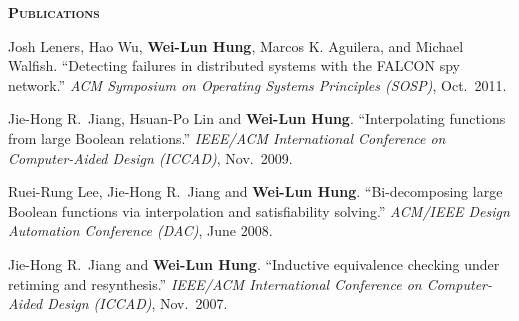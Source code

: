 \documentclass[11pt, letterpaper]{article}
\newcommand{\myscitem}[1]{\vspace{0.5\baselineskip} {\Large \textbf{\textsc{#1}} \reallynopagebreak}}
\newcommand{\mydate}[1]{{\small #1}}
\newcommand{\myname}[1]{{\bf #1}}
\newcommand{\myright}{\hspace*\fill}
\newcommand{\myrightdate}[1]{\myright \mydate{#1}}
\newenvironment{myexp}{
  \begin{list}{}{
      \setlength{\itemindent}{-0.15in}
      \setlength{\leftmargin}{0.3in}
      \addtolength{\topsep}{-0.1in}
    }
}{\end{list}}
\newenvironment{myenumerate}{
  \begin{list}{[\arabic{enumi}]}{
      \usecounter{enumi}
      \setlength{\itemindent}{0in}
      \setlength{\leftmargin}{0.3in}
      \addtolength{\topsep}{-0.1in}
    }
}{\end{list}}
\newenvironment{mybullet}{
  \begin{list}{\labelitemi}{
      \setlength{\itemindent}{0in}
      \setlength{\leftmargin}{0.15in}
      \setlength{\topsep}{0.02in}
      \setlength{\partopsep}{0pt}
    }
}{\end{list}}
\begin{document}
\begin{myexp}
\end{myexp}

\myscitem{Publications}

\begin{myenumerate}
\item Josh Leners, Hao Wu, \myname{Wei-Lun Hung}, Marcos K. Aguilera, and Michael Walfish.
``Detecting failures in distributed systems with the FALCON spy network.''
{\it ACM Symposium on Operating Systems Principles (SOSP)}, Oct.~2011.
\item Jie-Hong R.~Jiang, Hsuan-Po Lin and  \myname{Wei-Lun Hung}.
  ``Interpolating functions from large Boolean relations.''
  {\it  IEEE/ACM International Conference on Computer-Aided Design (ICCAD)},  Nov.~2009.
\item Ruei-Rung Lee, Jie-Hong R.~Jiang and \myname{Wei-Lun Hung}.
  ``Bi-decomposing large Boolean functions via interpolation and satisfiability solving.''
  {\it ACM/IEEE Design Automation Conference (DAC)}, June 2008. %
\item Jie-Hong R.~Jiang and \myname{Wei-Lun Hung}.
  ``Inductive equivalence checking under retiming and resynthesis.''
  {\it IEEE/ACM International Conference on Computer-Aided Design (ICCAD)},
  Nov.~2007.%
\end{myenumerate}







\end{document}
